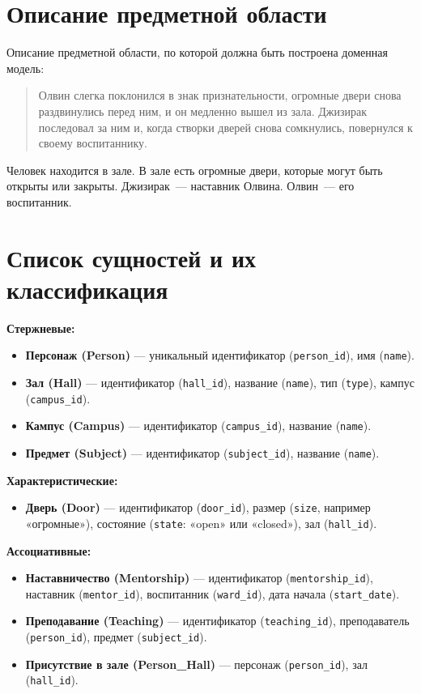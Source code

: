 \documentclass[12pt, a4paper]{article}
\begin{document}
\section{Описание предметной области}

Описание предметной области, по которой должна быть построена доменная модель:

\begin{quote}
Олвин слегка поклонился в знак признательности, огромные двери снова раздвинулись перед ним, и он медленно вышел из зала. Джизирак последовал за ним и, когда створки дверей снова сомкнулись, повернулся к своему воспитаннику.
\end{quote}

Человек находится в зале. В зале есть огромные двери, которые могут быть открыты или закрыты. Джизирак~--- наставник Олвина. Олвин~--- его воспитанник.
\newpage
\section{Список сущностей и их классификация}

\textbf{Стержневые:}
\begin{itemize}
    \item \textbf{Персонаж (Person)} --- уникальный идентификатор (\texttt{person\_id}), имя (\texttt{name}).
    \item \textbf{Зал (Hall)} --- идентификатор (\texttt{hall\_id}), название (\texttt{name}), тип (\texttt{type}), кампус (\texttt{campus\_id}).
    \item \textbf{Кампус (Campus)} --- идентификатор (\texttt{campus\_id}), название (\texttt{name}).
    \item \textbf{Предмет (Subject)} --- идентификатор (\texttt{subject\_id}), название (\texttt{name}).
\end{itemize}

\textbf{Характеристические:}
\begin{itemize}
    \item \textbf{Дверь (Door)} --- идентификатор (\texttt{door\_id}), размер (\texttt{size}, например «огромные»), состояние (\texttt{state}: «open» или «closed»), зал (\texttt{hall\_id}).
\end{itemize}

\textbf{Ассоциативные:}
\begin{itemize}
    \item \textbf{Наставничество (Mentorship)} --- идентификатор (\texttt{mentorship\_id}), наставник (\texttt{mentor\_id}), воспитанник (\texttt{ward\_id}), дата начала (\texttt{start\_date}).
    \item \textbf{Преподавание (Teaching)} --- идентификатор (\texttt{teaching\_id}), преподаватель (\texttt{person\_id}), предмет (\texttt{subject\_id}).
    \item \textbf{Присутствие в зале (Person\_Hall)} --- персонаж (\texttt{person\_id}), зал (\texttt{hall\_id}).
\end{itemize}
\end{document}
